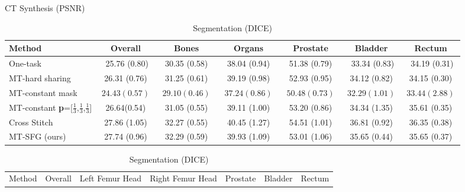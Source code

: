 \begin{table}[t!]
    \begin{subtable}[t]{1.0\linewidth}
        \caption{CT Synthesis (PSNR)}
        \vspace{-5mm}
        \begin{center}
            \scriptsize
            \begin{tabular}{l|c|ccccc}
            \hline
                \toprule
                Method   & Overall   &  Bones  & Organs &  Prostate & Bladder & Rectum  \\
                \midrule
                 One-task  \cite{wenqi} & $\,\,$ 25.76 (0.80)$\,\,$ & $\,\,$ 30.35 (0.58) $\,\,$  & $\,\,$ 38.04 (0.94) $\,\,$ & $\,\,$ 51.38 (0.79) $\,\,$ & $\,\,$ 33.34 (0.83)$\,\,$ & $\,\,$ 34.19 (0.31)$\,\,$  \\
                \multirow{1}{*}{MT-hard sharing }  & 26.31 (0.76) & 31.25 (0.61) & 39.19 (0.98) & 52.93 (0.95)  & 34.12 (0.82) & 34.15 (0.30) \\
                \multirow{1}{*}{MT-constant mask}   &  $24.43 (0.57)$  & $29.10 (0.46)$  & $37.24 (0.86)$ & $50.48 (0.73) $  & $32.29 (1.01)$ & $33.44 (2.88)$  \\
                \multirow{1}{*}{MT-constant \textbf{p}=[$\frac{1}{3}$,$\frac{1}{3}$,$\frac{1}{3}$]}   & 26.64(0.54)  & 31.05 (0.55) & 39.11 (1.00)    & \cellcolor{blue!15} 53.20 (0.86)  & 34.34 (1.35) &  35.61 (0.35) \\
                \multirow{1}{*}{Cross Stitch \cite{MisraCrossMTL16}}   & \cellcolor{red!15}  27.86 (1.05)  & \cellcolor{blue!15}  32.27 (0.55)  & \cellcolor{red!15}  40.45 (1.27)  & \cellcolor{red!15} 54.51 (1.01)     & \cellcolor{red!15}  36.81 (0.92) &  \cellcolor{red!15} 36.35 (0.38)     \\
                \multirow{1}{*}{MT-SFG (ours)}  &   \cellcolor{blue!15} 27.74 (0.96) &  \cellcolor{red!15}  32.29 (0.59)&  \cellcolor{blue!15}  39.93 (1.09)& 53.01 (1.06)   &  \cellcolor{blue!15} 35.65 (0.44)& \cellcolor{blue!15} 35.65 (0.37)  \\
        \hline
        \end{tabular}
        \end{center}
    \label{tab:ct}
    \end{subtable}
    
    \begin{subtable}[t]{1.0\linewidth}
        \vspace{0mm}
        \caption{Segmentation (DICE)}
        \vspace{-5mm}
        \begin{center}
            \centering
            \scriptsize
            \begin{tabular}{l|c|ccccc}
            \hline
                \toprule
                Method & Overall  &   Left Femur Head &  Right Femur Head &  Prostate & Bladder & Rectum   \\
                

\end{tabular}
\end{center}
\end{subtable}
\end{table}
